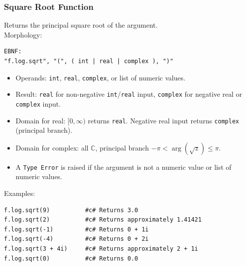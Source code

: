 \subsubsection{Square Root Function}
Returns the principal square root of the argument. \\
Morphology:
\begin{verbatim}
EBNF:
"f.log.sqrt", "(", ( int | real | complex ), ")"
\end{verbatim}
\begin{itemize}
\item Operands: \texttt{int}, \texttt{real}, \texttt{complex}, or list of numeric values.
\item Result: \texttt{real} for non-negative \texttt{int}/\texttt{real} input, \texttt{complex} for negative real or \texttt{complex} input.
\item Domain for real: $[0, \infty)$ returns \texttt{real}. Negative real input returns \texttt{complex} (principal branch).
\item Domain for complex: all $\mathbb{C}$, principal branch $-\pi < \arg(\sqrt{z}) \leq \pi$.
\item A \texttt{Type Error} is raised if the argument is not a numeric value or list of numeric values.
\end{itemize}
Examples:
\begin{verbatim}
f.log.sqrt(9)          #c# Returns 3.0
f.log.sqrt(2)          #c# Returns approximately 1.41421
f.log.sqrt(-1)         #c# Returns 0 + 1i
f.log.sqrt(-4)         #c# Returns 0 + 2i
f.log.sqrt(3 + 4i)     #c# Returns approximately 2 + 1i
f.log.sqrt(0)          #c# Returns 0.0
\end{verbatim}

